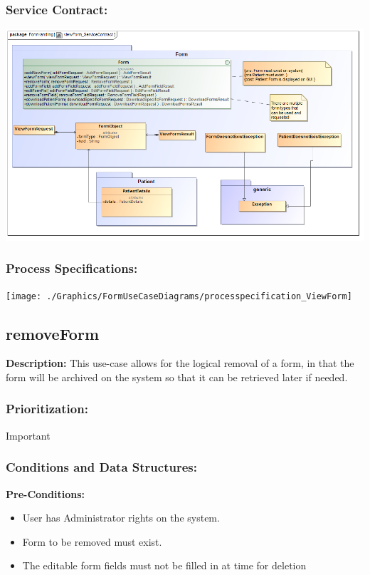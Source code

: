 \subsubsection{Service Contract:} 
\includegraphics[width=1\linewidth]{./Graphics/FormUseCaseDiagrams/viewForm_ServiceContract}
\subsubsection{Process Specifications:} 
\texttt{[image: ./Graphics/FormUseCaseDiagrams/processpecification\_ViewForm]}






\subsection{removeForm}
\textbf{Description:}
This use-case allows for the logical removal of a form, in that the form will be archived on the system so that it can be retrieved later if needed.
\subsubsection{Prioritization:}
Important
\subsubsection{Conditions and Data Structures:}
\textbf{Pre-Conditions:}
\begin{itemize}
	\item User has Administrator rights on the system.
	\item Form to be removed must exist.
	\item The editable form fields must not be filled in at time for deletion
\end{itemize}

